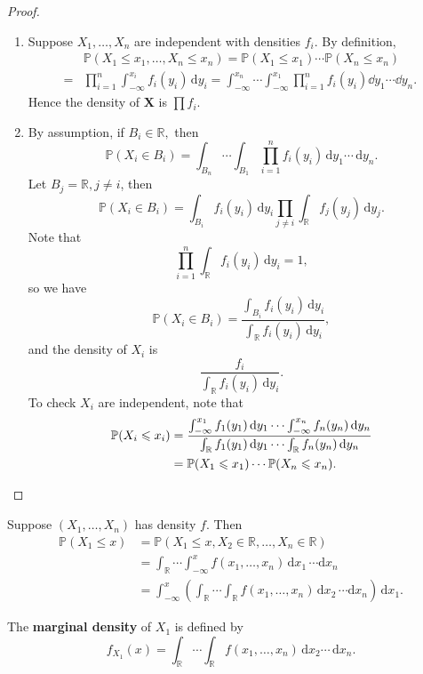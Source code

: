 \begin{proof}
    \begin{enumerate}
        \item Suppose $ X_1,\dots,X_n $ are independent with densities $ f_i $. By definition, 
        \begin{align*}
            &\mathbb{P}(X_1\le x_1,\dots, X_n\le x_n) = \mathbb{P}(X_1\le x_1)\cdots \mathbb{P}(X_n\le x_n)\\ 
            =& \prod_{i=1}^{n} \int_{-\infty}^{x_i} f_i(y_i) \,\mathrm{d}y_i
            = \int_{-\infty}^{x_n} \cdots \int_{-\infty}^{x_1} \prod_{i=1}^{n}f_i(y_i)\dd y_1\cdots\dd y_n.\ 
        \end{align*}
        Hence the density of $\mathbf{X}$ is $\prod f_i $.
        \item By assumption, if $ B_i\in \mathbb{R}, $ then 
        \[
            \mathbb{P}(X_i\in B_i) = \int_{B_n} \cdots \int_{B_1} \prod_{i=1}^{n}f_i(y_i) \,\mathrm{d}y_1\cdots \,\mathrm{d}y_n.
        \]
        Let $ B_j=\mathbb{R}, j\neq i $, then 
        \[
            \mathbb{P}(X_i\in B_i)= \int_{B_i} f_i(y_i) \,\mathrm{d}y_i \prod_{j\neq i} \int_{\mathbb{R}} f_j(y_j) \,\mathrm{d}y_j.
        \]
        Note that 
        \[
            \prod_{i=1}^{n}\int_{\mathbb{R}} f_i(y_i) \,\mathrm{d}y_i=1,
        \]
        so we have 
        \[
            \mathbb{P}(X_i\in B_i) = \frac{\int_{B_i} f_i(y_i) \,\mathrm{d}y_i}{\int_{\mathbb{R}} f_i(y_i) \,\mathrm{d}y_i},
        \]
        and the density of $X_i$ is 
        \[
            \frac{f_i}{\int_{\mathbb{R}} f_i(y_i) \,\mathrm{d}y_i}.
        \]
        To check $X_i$ are independent, note that 
        \begin{align*}
            \mathbb{P}(X_i\le x_i)&= \frac{\int_{-\infty}^{x_1} f_1(y_1) \,\mathrm{d}y_1 \cdots \int_{-\infty}^{x_n} f_n(y_n) \,\mathrm{d}y_n}{\int_{\mathbb{R}} f_1(y_1) \,\mathrm{d}y_1 \cdots \int_{\mathbb{R}} f_n(y_n) \,\mathrm{d}y_n}\\ 
            &= \mathbb{P}(X_1\le x_1)\cdots \mathbb{P}(X_n\le x_n).\qedhere
        \end{align*}
    \end{enumerate}
\end{proof}

Suppose $ (X_1,\dots,X_n) $ has density $f$. Then 
\begin{align*}
    \mathbb{P}(X_1\le x)&= \mathbb{P}(X_1\le x,X_2\in \mathbb{R}, \dots, X_n \in \mathbb{R})\\ 
    &= \int_{\mathbb{R}} \cdots \int_{-\infty}^{x} f(x_1,\dots,x_n) \,\mathrm{d}x_1 \, \cdots \mathrm{d}x_n\\ 
    &= \int_{-\infty}^{x} \left( \int_{\mathbb{R}}\cdots \int_{\mathbb{R}} f(x_1,\dots,x_n) \,\mathrm{d}x_2 \,\cdots\mathrm{d}x_n \right) \,\mathrm{d}x_1.
\end{align*}
\begin{definition}
    The \textbf{marginal density} of $X_1$ is defined by 
    \[
        f_{X_1}(x) = \int_{\mathbb{R}}\cdots \int_{\mathbb{R}} f(x_1,\dots,x_n) \,\mathrm{d}x_2\cdots \,\mathrm{d}x_n.
    \]
\end{definition}
